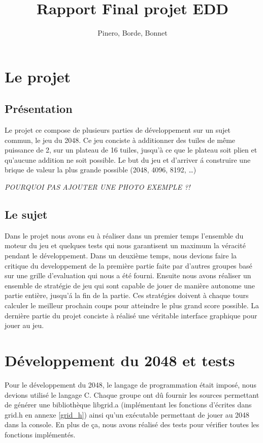 \documentclass[12pt]{article}
\title{Rapport Final projet EDD}
\author{Pinero, Borde, Bonnet}
\begin{document}
\maketitle
\tableofcontents

\newpage

\section{Le projet}
\subsection{Pr\'esentation}
Le projet ce compose de plusieurs parties de d\'eveloppement sur un sujet
commun, le jeu du 2048. Ce jeu conciste \`a additionner des tuiles de m\^eme
puissance de 2, sur un plateau de 16 tuiles, jusqu'\`a ce que le plateau soit
plien et qu'aucune addition ne soit possible. Le but du jeu et d’arriver \'a
construire une brique de valeur la plus grande possible (2048, 4096,
8192, \ldots)
\par 
\emph{\color{red}POURQUOI PAS AJOUTER UNE PHOTO EXEMPLE ?!}
\subsection{Le sujet}
Dans le projet nous avons eu \`a r\'ealiser dans un premier temps l'ensemble du
moteur du jeu et quelques tests qui nous garantisent un maximum la v\'eracit\'e 
pendant le d\'eveloppement. Dans un deuxi\`eme temps, nous devions faire la
\og critique \fg{} du developpement de la premi\`ere partie faite par
d'autres groupes bas\'e sur une grille d'evaluation qui nous a \'et\'e
fourni. Ensuite nous avons r\'ealiser un ensemble de strat\'egie de jeu qui
sont capable de jouer de mani\`ere autonome une partie enti\`ere, jusqu'\'a la
fin de la partie. Ces strat\'egies doivent \`a chaque tours calculer le meilleur
prochain coups pour atteindre le plus grand score possible. La derni\`ere partie
du projet conciste \`a r\'ealis\'e une v\'eritable interface graphique pour
jouer au jeu.

\newpage
\section{D\'eveloppement du 2048 et tests}
Pour le d\'eveloppement du 2048, le langage de programmation \'etait impos\'e,
nous devions utilis\'e le langage C. Chaque groupe ont d\^u fournir les sources
permettant de g\'en\'erer une biblioth\`eque libgrid.a (impl\'ementant les
fonctions d'\'ecrites dans grid.h en annexe \ref{grid_h}) ainsi qu’un
ex\'ecutable permettant de jouer au 2048 dans la console. En plus de ça, nous
avons r\'ealis\'e des tests pour v\'erifier toutes les fonctions
impl\'ement\'es.\par
\end{document}

